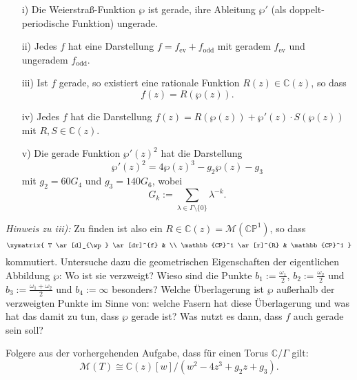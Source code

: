 \documentclass[a4paper,11pt]{article}
\newcounter{aufg}
\newcommand{\Aufg}{\stepcounter{aufg}\vspace*{0.2cm}\noindent{\bf
    Aufgabe \arabic{aufg}:} }
\begin{document}
\begin{enumerate}
	\item[i)] Die Weierstraß-Funktion $\wp$ ist gerade, ihre Ableitung $\wp'$ (als doppelt-periodische Funktion) ungerade.
	\item[ii)] Jedes $f$ hat eine Darstellung $f = f_{\text{ev}} + f_{\text{odd}}$ mit geradem $f_{\text{ev}}$ und ungeradem $f_{\text{odd}}$.
	\item[iii)] Ist $f$ gerade, so existiert eine rationale Funktion $R(z) \in \mathbb{C}(z)$, so dass
	\[
	f(z) = R(\wp(z)).
	\]
	\item[iv)] Jedes $f$ hat die Darstellung $f(z) = R(\wp(z)) + \wp'(z) \cdot S(\wp(z))$ mit $R, S \in \mathbb{C}(z)$.
	\item[v)] Die gerade Funktion $\wp'(z)^2$ hat die Darstellung
	\[
	\wp'(z)^2 = 4\wp(z)^3 - g_2 \wp(z) - g_3
	\]
	mit $g_2 = 60 G_4$ und $g_3 = 140 G_6$, wobei
	\[
	G_k := \sum_{\lambda \in \Gamma \setminus \{0\}} \lambda^{-k}.
	\]
\end{enumerate}

\textit{Hinweis zu iii):} Zu finden ist also ein $R \in \mathbb{C}(z) = \mathcal{M}(\mathbb{CP}^1)$, so dass
\[
\xymatrix{
	T \ar[d]_{\wp}  \ar[dr]^{f} & \\
	\mathbb{CP}^1 \ar[r]^{R} & \mathbb{CP}^1
}
\]
kommutiert. Untersuche dazu die geometrischen Eigenschaften der eigentlichen Abbildung $\wp$: Wo ist sie verzweigt? Wieso sind die Punkte $b_1 := \tfrac{\omega_1}{2}$, $b_2 := \tfrac{\omega_2}{2}$ und $b_3 := \tfrac{\omega_1+\omega_2}{2}$ und $b_4 := \infty$ besonders? Welche Überlagerung ist $\wp$ außerhalb der verzweigten Punkte im Sinne von: welche Fasern hat diese Überlagerung und was hat das damit zu tun, dass $\wp$ gerade ist? Was nutzt es dann, dass $f$ auch gerade sein soll?

\medskip

\Aufg Folgere aus der vorhergehenden Aufgabe, dass für einen Torus $\mathbb{C}/\Gamma$ gilt:
\[
\mathcal{M}(T) \cong \mathbb{C}(z)[w] / (w^2 - 4z^3 + g_2z + g_3).
\]
\end{document}
